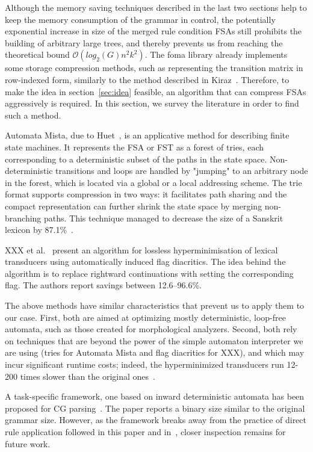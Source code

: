 \documentclass{article}
\begin{document}
Although the memory saving techniques described in the last two sections help to
keep the memory consumption of the grammar in control, the potentially
exponential increase in size of the merged rule condition FSAs still prohibits
the building of arbitrary large trees, and thereby prevents us from reaching
the theoretical bound $\mathcal{O}(log_2(G)n^2k^2)$. The foma library already
implements some storage compression methods, such as representing the transition
matrix in row-indexed form, similarly to the method described in Kiraz~.
Therefore, to make the idea in section~\ref{sec:idea} feasible, an algorithm that
can compress FSAs aggressively is required. %
In this section, we survey the literature in order to find such a method.

Automata Mista, due to Huet~, is an applicative
method for describing finite state machines. It represents the FSA or FST as
a forest of tries, each corresponding to a deterministic subset of the paths in
the state space. Non-deterministic transitions and loops are handled by
"jumping" to an arbitrary node in the forest, which is located via a global or a
local addressing scheme. The trie format supports compression in two ways: it
facilitates path sharing and the compact representation can further shrink the
state space by merging non-branching paths. This technique managed to decrease
the size of a Sanskrit lexicon by 87.1\%~\cite{Huet:2005}.

XXX et al.~ present an algorithm for lossless
hyperminimisation of lexical transducers using automatically induced flag
diacritics. The idea behind the algorithm is to replace rightward continuations
with setting the corresponding flag. The authors report savings between
12.6--96.6\%.

The above methods have similar characteristics that prevent us to apply them to
our case. First, both are aimed at optimizing mostly deterministic, loop-free
automata, such as those created for morphological analyzers. Second, both rely
on techniques that are beyond the power of the simple automaton interpreter
we are using (tries for Automata Mista and flag diacritics for XXX), and which
may incur significant runtime costs; indeed, the hyperminimized transducers run
12-200 times slower than the original ones~\cite{XXX:2014}. 

A task-specific framework, one based on inward deterministic automata has
been proposed for CG parsing~\cite{Yli-Jyra:2011}. The paper reports a binary
size similar to the original grammar size. However, as the framework breaks away
from the practice of direct rule application followed in this paper and
in~\cite{Hulden:2011,Peltonen:2011}, closer inspection remains for future work. 
\end{document}
